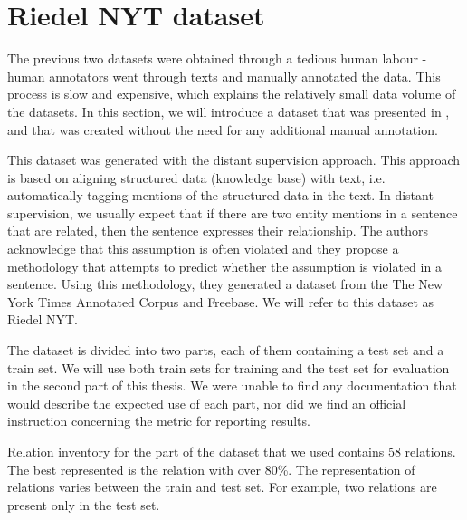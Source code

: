 



\section{Riedel NYT dataset}
The previous two datasets were obtained through a tedious human labour - human annotators went through texts and manually annotated the data. This process is slow and expensive, which explains the relatively small data volume of the datasets. In this section, we will introduce a dataset that was presented in \cite{nytdistant}, and that was created without the need for any additional manual annotation.


This dataset was generated with the distant supervision approach. This approach is based on aligning structured data (knowledge base) with text, i.e. automatically tagging mentions of the structured data in the text. In distant supervision, we usually expect that if there are two entity mentions in a sentence that are related, then the sentence expresses their relationship. The authors acknowledge that this assumption is often violated and they propose a methodology that attempts to predict whether the assumption is violated in a sentence. Using this methodology, they generated a dataset from the The New York Times Annotated Corpus  and Freebase. We will refer to this dataset as Riedel NYT.

The dataset is divided into two parts, each of them containing a test set and a train set. We will use both train sets for training and the  test set for evaluation in the second part of this thesis. We were unable to find any documentation that would describe the expected use of each part, nor did we find an official instruction concerning the metric for reporting results.


Relation inventory for the part of the dataset that we used contains 58 relations. The best represented is the  relation with over 80\%. The representation of relations varies between the train and test set. For example, two relations are present only in the test set. 






